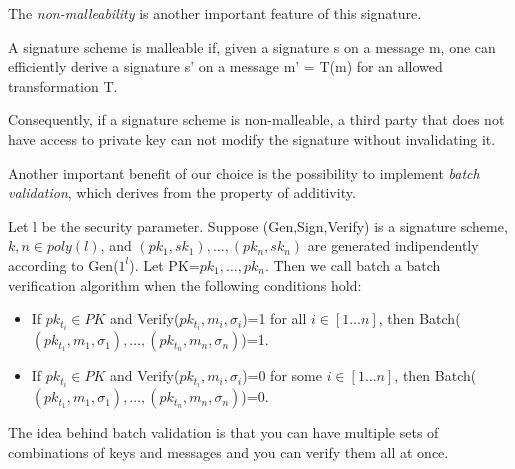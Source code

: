 
The \textit{non-malleability} is another important feature of this signature.

\begin{teorema}
	A signature scheme is malleable if, given a signature s on a message m, one can efficiently derive a signature s' on a message m' = T(m) for an allowed transformation T.
\end{teorema}

Consequently, if a signature scheme is non-malleable, a third party that does not have access to private key can not modify the signature without invalidating it.

Another important benefit of our choice is the possibility to implement \textit{batch validation}, which derives from the property of additivity.
\begin{teorema}
	Let l be the security parameter. Suppose (Gen,Sign,Verify) is a signature scheme, $k, n \in poly(l)$, and $(pk_{1},sk_{1}), \dots, (pk_{n},sk_{n})$ are generated indipendently according to Gen($1^{l}$). Let PK=${pk_{1},\dots,pk_{n}}$. Then we call batch a batch verification algorithm when the following conditions hold:
	\begin{itemize}
		\item If $pk_{t_{i}} \in PK$ and Verify($pk_{t_{i}},m_{i},\sigma_{i}$)=1 for all $i \in [1 \dots n]$, then Batch($(pk_{t_{1}},m_{1},\sigma_{1}),\dots, (pk_{t_{n}},m_{n},\sigma_{n})$)=1.
		\item If $pk_{t_{i}} \in PK$ and Verify($pk_{t_{i}},m_{i},\sigma_{i}$)=0 for some $i \in [1 \dots n]$, then Batch($(pk_{t_{1}},m_{1},\sigma_{1}),\dots, (pk_{t_{n}},m_{n},\sigma_{n})$)=0.
	\end{itemize}
\end{teorema}
The idea behind batch validation is that you can have multiple sets of combinations of keys and messages and you can verify them all at once.




\noindent 